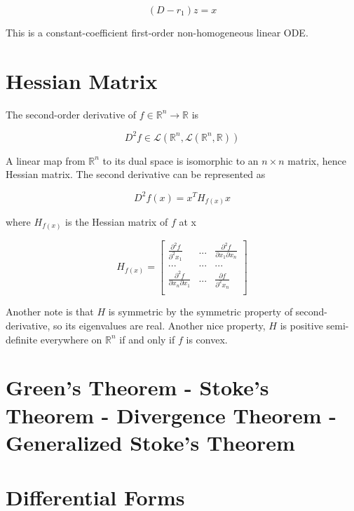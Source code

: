 \documentclass{article}
\begin{document}
\begin{equation}
    (D - r_1) z = x
\end{equation}

This is a constant-coefficient first-order non-homogeneous linear ODE.

\section{Hessian Matrix}

The second-order derivative of $f \in \mathbb{R}^n \to \mathbb{R}$ is

\begin{equation}
    D^2 f \in \mathcal{L}(\mathbb{R}^n, \mathcal{L}(\mathbb{R}^n, \mathbb{R}))
\end{equation}

A linear map from $\mathbb{R}^n$ to its dual space is isomorphic to an $n \times n$ matrix, hence Hessian matrix. The second derivative can be represented as

\begin{equation}
    D^2 f(x) = x^T H_{f(x)} x
\end{equation}

where $H_{f(x)}$ is the Hessian matrix of $f$ at x

\begin{equation}
H_{f(x)} = \begin{bmatrix}
\frac{\partial^2 f}{\partial^2 x_1} & ... & \frac{\partial^2 f}{\partial x_1 \partial x_n} \\
... & ... & ... \\
\frac{\partial^2 f}{\partial x_n \partial x_1} & ... & \frac{\partial f}{\partial^2 x_n} \\
\end{bmatrix}    
\end{equation}

Another note is that $H$ is symmetric by the symmetric property of second-derivative, so its  eigenvalues are real. Another nice property, $H$ is positive semi-definite everywhere on $\mathbb{R}^n$ if and only if $f$ is convex.

\section{Green's Theorem - Stoke's Theorem - Divergence Theorem - Generalized Stoke's Theorem}

\section{Differential Forms}




\end{document}
